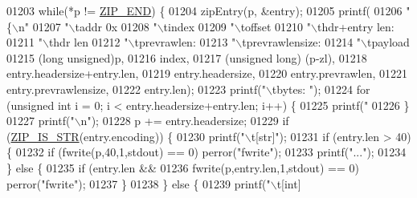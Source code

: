 \begin{DoxyCode}
{{{{{01203     \textcolor{keywordflow}{while}(*p != \hyperlink{ziplist_8c_a31a8f9d5b5bad75318741cfca5de5ea8}{ZIP\_END}) \{
01204         zipEntry(p, &entry);
01205         printf(
01206             \textcolor{stringliteral}{"\{\(\backslash\)n"}
01207                 \textcolor{stringliteral}{"\(\backslash\)taddr 0x%
01208                 \textcolor{stringliteral}{"\(\backslash\)tindex %
01209                 \textcolor{stringliteral}{"\(\backslash\)toffset %
01210                 \textcolor{stringliteral}{"\(\backslash\)thdr+entry len: %
01211                 \textcolor{stringliteral}{"\(\backslash\)thdr len%
01212                 \textcolor{stringliteral}{"\(\backslash\)tprevrawlen: %
01213                 \textcolor{stringliteral}{"\(\backslash\)tprevrawlensize: %
01214                 \textcolor{stringliteral}{"\(\backslash\)tpayload %
01215             (\textcolor{keywordtype}{long} \textcolor{keywordtype}{unsigned})p,
01216             index,
01217             (\textcolor{keywordtype}{unsigned} \textcolor{keywordtype}{long}) (p-zl),
01218             entry.headersize+entry.len,
01219             entry.headersize,
01220             entry.prevrawlen,
01221             entry.prevrawlensize,
01222             entry.len);
01223         printf(\textcolor{stringliteral}{"\(\backslash\)tbytes: "});
01224         \textcolor{keywordflow}{for} (\textcolor{keywordtype}{unsigned} \textcolor{keywordtype}{int} i = 0; i < entry.headersize+entry.len; i++) \{
01225             printf(\textcolor{stringliteral}{"%
01226         \}
01227         printf(\textcolor{stringliteral}{"\(\backslash\)n"});
01228         p += entry.headersize;
01229         \textcolor{keywordflow}{if} (\hyperlink{ziplist_8c_a2cb79e478d5bda74592c92230cfd6761}{ZIP\_IS\_STR}(entry.encoding)) \{
01230             printf(\textcolor{stringliteral}{"\(\backslash\)t[str]"});
01231             \textcolor{keywordflow}{if} (entry.len > 40) \{
01232                 \textcolor{keywordflow}{if} (fwrite(p,40,1,stdout) == 0) perror(\textcolor{stringliteral}{"fwrite"});
01233                 printf(\textcolor{stringliteral}{"..."});
01234             \} \textcolor{keywordflow}{else} \{
01235                 \textcolor{keywordflow}{if} (entry.len &&
01236                     fwrite(p,entry.len,1,stdout) == 0) perror(\textcolor{stringliteral}{"fwrite"});
01237             \}
01238         \} \textcolor{keywordflow}{else} \{
01239             printf(\textcolor{stringliteral}{"\(\backslash\)t[int]%
}}}}}}}}}}}}}}}
\end{DoxyCode}
